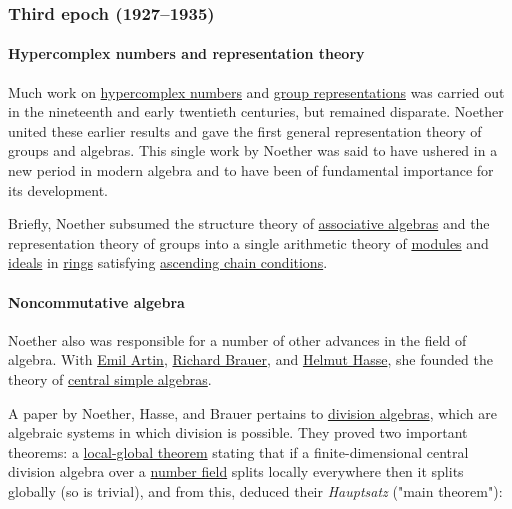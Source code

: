 \subsubsection[Third epoch (1927--1935)]{\texorpdfstring{\protect\hypertarget{Third_epoch_.281927.E2.80.931935.29}{}{}Third epoch (1927--1935)}{Third epoch (1927--1935)}}\label{Third_epoch_ux281927ux20131935ux29}


\paragraph{Hypercomplex numbers and representation theory}\label{Hypercomplex_numbers_and_representation_theory}

Much work on \href{https://en.wikipedia.org/wiki/Hypercomplex_number}{hypercomplex numbers} and \href{https://en.wikipedia.org/wiki/Group_representation}{group representations} was carried out in the nineteenth and early twentieth centuries, but remained disparate. Noether united these earlier results and gave the first general representation theory of groups and algebras. This single work by Noether was said to have ushered in a new period in modern algebra and to have been of fundamental importance for its development.

Briefly, Noether subsumed the structure theory of \href{https://en.wikipedia.org/wiki/Associative_algebra}{associative algebras} and the representation theory of groups into a single arithmetic theory of \href{https://en.wikipedia.org/wiki/Module_(mathematics)}{modules} and \href{https://en.wikipedia.org/wiki/Ideal_(ring_theory)}{ideals} in \href{https://en.wikipedia.org/wiki/Ring_(mathematics)}{rings} satisfying \href{https://en.wikipedia.org/wiki/Ascending_chain_condition}{ascending chain conditions}.


\paragraph{Noncommutative algebra}\label{Noncommutative_algebra}

Noether also was responsible for a number of other advances in the field of algebra. With \href{https://en.wikipedia.org/wiki/Emil_Artin}{Emil Artin}, \href{https://en.wikipedia.org/wiki/Richard_Brauer}{Richard Brauer}, and \href{https://en.wikipedia.org/wiki/Helmut_Hasse}{Helmut Hasse}, she founded the theory of \href{https://en.wikipedia.org/wiki/Central_simple_algebra}{central simple algebras}.

A paper by Noether, Hasse, and Brauer pertains to \href{https://en.wikipedia.org/wiki/Division_algebra}{division algebras}, which are algebraic systems in which division is possible. They proved two important theorems: a \href{https://en.wikipedia.org/wiki/Hasse_principle}{local-global theorem} stating that if a finite-dimensional central division algebra over a \href{https://en.wikipedia.org/wiki/Number_field}{number field} splits locally everywhere then it splits globally (so is trivial), and from this, deduced their \emph{Hauptsatz} ("main theorem"):

